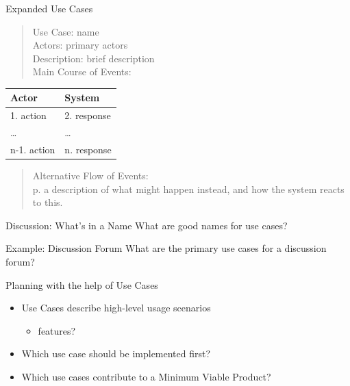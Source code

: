 \documentclass[10pt,t,a4paper]{beamer}
\begin{document}
\begin{frame}[label=sec-1-7]{Expanded Use Cases}
\begin{verse}
Use Case: name \\
Actors: primary actors \\
Description: brief description \\
Main Course of Events: \\
\end{verse}
\begin{center}
\begin{tabular}{ll}
Actor & System\\
\hline
1. action & 2. response\\
… & …\\
n-1. action & n. response\\
\end{tabular}
\end{center}

\begin{verse}
Alternative Flow of Events: \\
\hspace*{3em}p. a description of what might happen instead, and how the system reacts to this. \\
\end{verse}
\end{frame}
\begin{frame}[label=sec-1-8]{Discussion: What's in a Name}
What are good names for use cases?

\begin{block}{Example: Discussion Forum}
What are the primary use cases for a discussion forum?
\end{block}
\end{frame}
\begin{frame}[label=sec-1-9]{Planning with the help of Use Cases}
\begin{itemize}
\item Use Cases describe high-level usage scenarios
\begin{itemize}
\item features?
\end{itemize}
\item Which use case should be implemented first?
\item Which use cases contribute to a Minimum Viable Product?
\end{itemize}
\end{frame}
\end{document}
